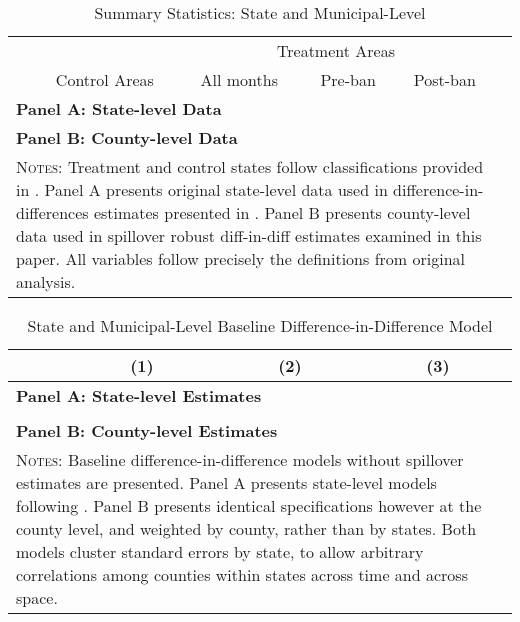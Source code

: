 \documentclass[12pt]{article}
\begin{document}
\begin{spacing}{1.3}
\begin{table}[htpb!]
  \begin{center}
    \caption{Summary Statistics: State and Municipal-Level}
    \begin{tabular}{lccccc} \toprule
      &&\multicolumn{3}{c}{Treatment Areas} \\ \cmidrule(r){3-5}
      &Control Areas & All months & Pre-ban & Post-ban\\ \midrule
      \multicolumn{5}{l}{\textbf{Panel A: State-level Data}} \\
      
      \multicolumn{5}{l}{\textbf{Panel B: County-level Data}} \\
       \bottomrule
      \multicolumn{5}{p{16cm}}{{\footnotesize \textsc{Notes}:
          Treatment and control states follow classifications provided in
          \citet{AboukAdams2013}. Panel A presents original state-level
          data used in difference-in-differences estimates presented in
          \citet{AboukAdams2013}.  Panel B presents county-level data
          used in spillover robust diff-in-diff estimates examined in this
          paper.  All variables follow precisely the definitions from
          original analysis.}} 
    \end{tabular}
  \end{center}
\end{table}



\begin{table}[htpb!]
  \begin{center}
    \caption{State and Municipal-Level Baseline Difference-in-Difference Model}
    \begin{tabular}{lccc}
      \toprule
      &(1)&(2)&(3) \\
      \midrule
      \multicolumn{4}{l}{\textbf{Panel A: State-level Estimates}} \\
       \\
      \multicolumn{4}{l}{\textbf{Panel B: County-level Estimates}} \\
      
      \bottomrule
      \multicolumn{4}{p{7.8cm}}{{\footnotesize \textsc{Notes}:
          Baseline difference-in-difference models without spillover estimates
          are presented.  Panel A presents state-level models following
          \citet{AboukAdams2013}. Panel B presents identical specifications
          however at the county level, and weighted by county, rather than
          by states.  Both models cluster standard errors by state, to allow
          arbitrary correlations among counties within states across time and
          across space.}} 
    \end{tabular}
  \end{center}
\end{table}


\end{spacing}
\end{document}
